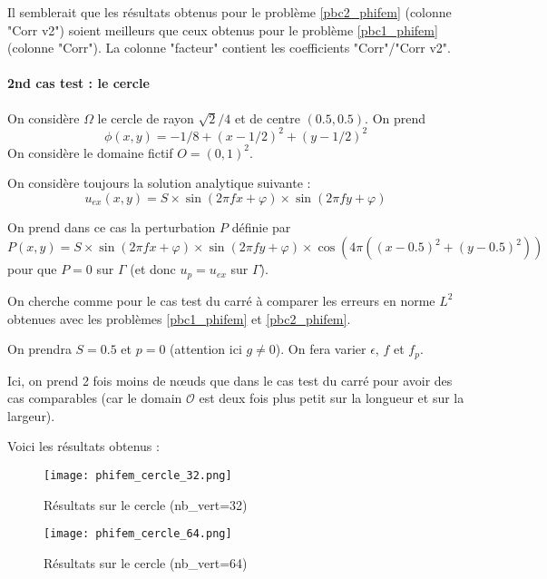 Il semblerait que les résultats obtenus pour le problème \ref{pbc2_phifem} (colonne "Corr v2") soient meilleurs que ceux obtenus pour le problème \ref{pbc1_phifem} (colonne "Corr"). La colonne "facteur" contient les coefficients "Corr"/"Corr v2".

\paragraph*{2nd cas test : le cercle \\}

On considère $\Omega$ le cercle de rayon $\sqrt{2}/4$ et de centre $(0.5,0.5)$. On prend 
$$\phi(x,y)=-1/8+(x-1/2)^2+(y-1/2)^2$$
On considère le domaine fictif $O=(0,1)^2$.

On considère toujours la solution analytique suivante :
$$u_{ex}(x,y) = S\times\sin(2\pi fx + \varphi)\times\sin(2\pi fy + \varphi)$$ 

On prend dans ce cas la perturbation $P$ définie par
$$P(x,y) = S\times\sin(2\pi fx + \varphi)\times\sin(2\pi fy + \varphi)\times\cos(4\pi((x-0.5)^2+(y-0.5)^2))$$ 
pour que $P=0$ sur $\Gamma$ (et donc $u_p=u_{ex}$ sur $\Gamma$). 

On cherche comme pour le cas test du carré à comparer les erreurs en norme $L^2$ obtenues avec les problèmes \ref{pbc1_phifem} et \ref{pbc2_phifem}.

On prendra $S=0.5$ et $p=0$ (attention ici $g\ne 0$). On fera varier $\epsilon$, $f$ et $f_p$. 

\begin{Rem}
	Ici, on prend 2 fois moins de nœuds que dans le cas test du carré pour avoir des cas comparables (car le domain $\mathcal{O}$ est deux fois plus petit sur la longueur et sur la largeur).
\end{Rem}

Voici les résultats obtenus :

\begin{minipage}{0.48\linewidth}
	\begin{figure}[H]
		\centering
		\texttt{[image: phifem\_cercle\_32.png]}
		\caption{Résultats sur le cercle (nb\_vert=32)}
	\end{figure}
\end{minipage}
\begin{minipage}{0.48\linewidth}
	\begin{figure}[H]
		\centering
		\texttt{[image: phifem\_cercle\_64.png]}
		\caption{Résultats sur le cercle (nb\_vert=64)}
	\end{figure}
\end{minipage}

